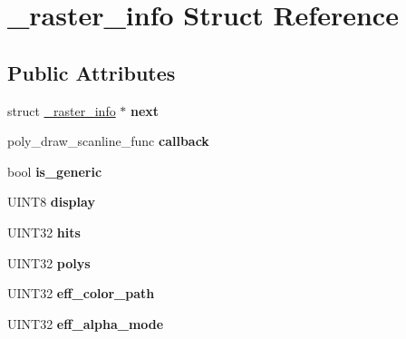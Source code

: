 \hypertarget{struct__raster__info}{\section{\-\_\-raster\-\_\-info Struct Reference}
\label{struct__raster__info}
}
\subsection*{Public Attributes}
\begin{DoxyCompactItemize}
\item 
\hypertarget{struct__raster__info_a61651bfed29ab0312c3fe68a359ff391}{struct \hyperlink{struct__raster__info}{\-\_\-raster\-\_\-info} $\ast$ {\bfseries next}}\label{struct__raster__info_a61651bfed29ab0312c3fe68a359ff391}

\item 
\hypertarget{struct__raster__info_a823bf5b1e293720f3e523de29cf44afa}{poly\-\_\-draw\-\_\-scanline\-\_\-func {\bfseries callback}}\label{struct__raster__info_a823bf5b1e293720f3e523de29cf44afa}

\item 
\hypertarget{struct__raster__info_acf1e6e260048f94854bf126c98854ae0}{bool {\bfseries is\-\_\-generic}}\label{struct__raster__info_acf1e6e260048f94854bf126c98854ae0}

\item 
\hypertarget{struct__raster__info_a6cff03227e5a74203b60bef17f51e262}{U\-I\-N\-T8 {\bfseries display}}\label{struct__raster__info_a6cff03227e5a74203b60bef17f51e262}

\item 
\hypertarget{struct__raster__info_a0249c21b537e59f9f47f9b77437e4376}{U\-I\-N\-T32 {\bfseries hits}}\label{struct__raster__info_a0249c21b537e59f9f47f9b77437e4376}

\item 
\hypertarget{struct__raster__info_a0a09de384966a90de43e8c96bb0eeb11}{U\-I\-N\-T32 {\bfseries polys}}\label{struct__raster__info_a0a09de384966a90de43e8c96bb0eeb11}

\item 
\hypertarget{struct__raster__info_a83a4a66e01490271e69d346e4ce10a43}{U\-I\-N\-T32 {\bfseries eff\-\_\-color\-\_\-path}}\label{struct__raster__info_a83a4a66e01490271e69d346e4ce10a43}

\item 
\hypertarget{struct__raster__info_a299dd9db8c5b0e0ce270cda7893f282f}{U\-I\-N\-T32 {\bfseries eff\-\_\-alpha\-\_\-mode}}\label{struct__raster__info_a299dd9db8c5b0e0ce270cda7893f282f}


\end{DoxyCompactItemize}
